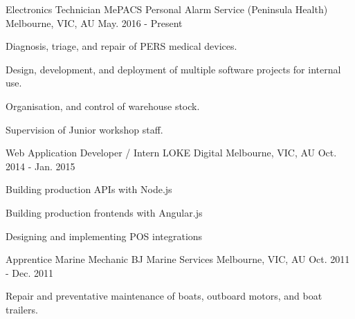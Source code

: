 

\begin{cventries}

  \cventry
    {Electronics Technician} %
    {MePACS Personal Alarm Service (Peninsula Health)} %
    {Melbourne, VIC, AU} %
    {May. 2016 - Present} %
    {
      \begin{cvitems} %
        \item {Diagnosis, triage, and repair of PERS medical devices.}
        \item {Design, development, and deployment of multiple software projects for internal use.}
        \item {Organisation, and control of warehouse stock.}
        \item {Supervision of Junior workshop staff.}
      \end{cvitems}
    }
  \cventry
    {Web Application Developer / Intern} %
    {LOKE Digital} %
    {Melbourne, VIC, AU} %
    {Oct. 2014 - Jan. 2015} %
    {
      \begin{cvitems} %
        \item {Building production APIs with Node.js}
        \item {Building production frontends with Angular.js}
        \item {Designing and implementing POS integrations}
      \end{cvitems}
    }
  \cventry
    {Apprentice Marine Mechanic}
    {BJ Marine Services}
    {Melbourne, VIC, AU}
    {Oct. 2011 - Dec. 2011}
    {
      \begin{cvitems}
        \item {Repair and preventative maintenance of  boats, outboard motors, and boat trailers.}
      \end{cvitems}
    }


\end{cventries}
